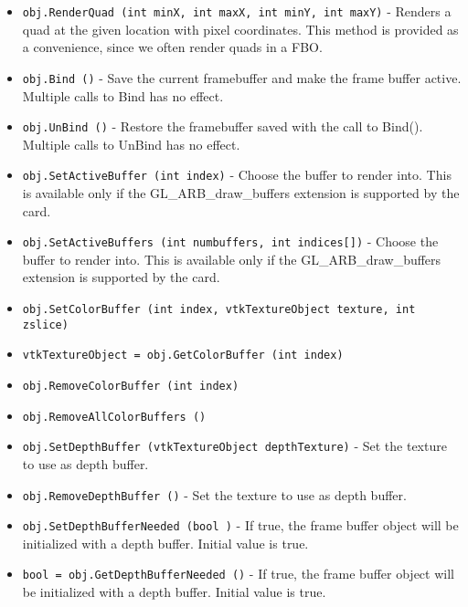 \begin{itemize}
\item  \verb|obj.RenderQuad (int minX, int maxX, int minY, int maxY)| -  Renders a quad at the given location with pixel coordinates. This method
 is provided as a convenience, since we often render quads in a FBO.
 
 
 
 
 
 

\item  \verb|obj.Bind ()| -  Save the current framebuffer and make the frame buffer active.
 Multiple calls to Bind has no effect.

\item  \verb|obj.UnBind ()| -  Restore the framebuffer saved with the call to Bind().
 Multiple calls to UnBind has no effect.

\item  \verb|obj.SetActiveBuffer (int index)| -  Choose the buffer to render into.
 This is available only if the GL\_ARB\_draw\_buffers extension is supported
 by the card.

\item  \verb|obj.SetActiveBuffers (int numbuffers, int indices[])| -  Choose the buffer to render into.
 This is available only if the GL\_ARB\_draw\_buffers extension is supported
 by the card.

\item  \verb|obj.SetColorBuffer (int index, vtkTextureObject texture, int zslice)|

\item  \verb|vtkTextureObject = obj.GetColorBuffer (int index)|

\item  \verb|obj.RemoveColorBuffer (int index)|

\item  \verb|obj.RemoveAllColorBuffers ()|

\item  \verb|obj.SetDepthBuffer (vtkTextureObject depthTexture)| -  Set the texture to use as depth buffer.

\item  \verb|obj.RemoveDepthBuffer ()| -  Set the texture to use as depth buffer.

\item  \verb|obj.SetDepthBufferNeeded (bool )| -  If true, the frame buffer object will be initialized with a depth buffer.
 Initial value is true.

\item  \verb|bool = obj.GetDepthBufferNeeded ()| -  If true, the frame buffer object will be initialized with a depth buffer.
 Initial value is true.


\end{itemize}
